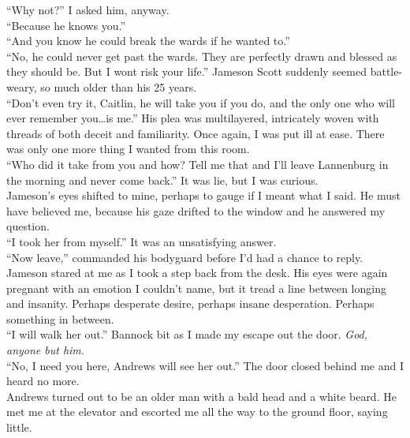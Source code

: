\documentclass[a5paper]{scrartcl}
\begin{document}
\enquote{Why not?} I asked him, anyway.\\


\enquote{Because he knows you.}\\


\enquote{And you know he could break the wards if he wanted to.}\\


\enquote{No, he could never get past the wards. They are perfectly drawn and blessed as they should be. But I wont risk your life.} Jameson Scott suddenly seemed battle-weary, so much older than his 25 years.\\


\enquote{Don't even try it, Caitlin,  he will take you if you do, and the only one who will ever remember you\dots is me.} His plea was multilayered, intricately woven with threads of both deceit and familiarity. Once again, I was put ill at ease. There was only one more thing I wanted from this room.\\


\enquote{Who did it take from you and how?  Tell me that and I'll leave Lannenburg in the morning and never come back.} It was lie, but I was curious.\\


Jameson's eyes shifted to mine, perhaps to gauge if I meant what I said. He must have believed me, because his gaze drifted to the window and he answered my question.\\


\enquote{I took her from myself.} It was an unsatisfying answer.\\


\enquote{Now leave,} commanded his bodyguard before I'd had a chance to reply. Jameson stared at me as I took a step back from the desk. His eyes were again pregnant with an emotion I couldn't name, but it tread a line between longing and insanity.  Perhaps desperate desire, perhaps insane desperation. Perhaps something in between.\\


\enquote{I will walk her out.} Bannock bit as I made my escape out the door. \textit{God, anyone but him.}
\\


\enquote{No, I need you here, Andrews will see her out.} The door closed behind me and I heard no more.\\


Andrews turned out to be an older man with a bald head and a white beard. He met me at the elevator and escorted me all the way to the ground floor, saying little.\\
\end{document}
